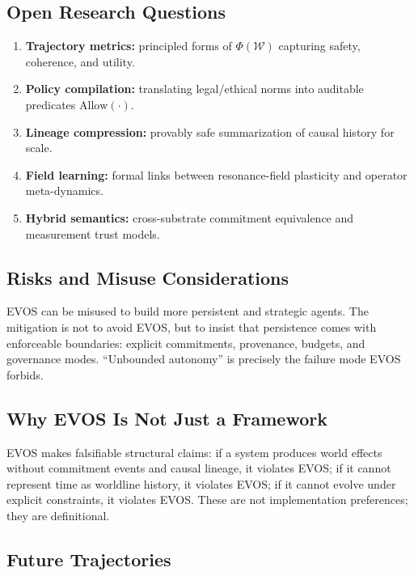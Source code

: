 \documentclass[11pt]{article}
\begin{document}
\subsection{Open Research Questions}
\label{sec:open-questions}

\begin{enumerate}
  \item \textbf{Trajectory metrics:} principled forms of $\Phi(\mathcal{W})$ capturing safety, coherence, and utility.
  \item \textbf{Policy compilation:} translating legal/ethical norms into auditable predicates $\mathrm{Allow}(\cdot)$.
  \item \textbf{Lineage compression:} provably safe summarization of causal history for scale.
  \item \textbf{Field learning:} formal links between resonance-field plasticity and operator meta-dynamics.
  \item \textbf{Hybrid semantics:} cross-substrate commitment equivalence and measurement trust models.
\end{enumerate}

\subsection{Risks and Misuse Considerations}
\label{sec:misuse}

EVOS can be misused to build more persistent and strategic agents. The mitigation is not to
avoid EVOS, but to insist that persistence comes with enforceable boundaries: explicit
commitments, provenance, budgets, and governance modes. ``Unbounded autonomy'' is precisely the
failure mode EVOS forbids.

\subsection{Why EVOS Is Not Just a Framework}
\label{sec:not-just-framework}

EVOS makes falsifiable structural claims: if a system produces world effects without commitment
events and causal lineage, it violates EVOS; if it cannot represent time as worldline history,
it violates EVOS; if it cannot evolve under explicit constraints, it violates EVOS. These are
not implementation preferences; they are definitional.

\subsection{Future Trajectories}
\label{sec:future}
\end{document}
